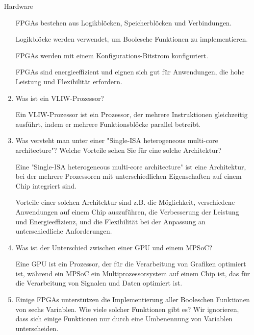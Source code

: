 \documentclass{article}
\begin{document}
\begin{exercise}{Hardware}
\begin{enumerate}
          \begin{solution}
            FPGAs bestehen aus Logikblöcken, Speicherblöcken und Verbindungen.

            Logikblöcke werden verwendet, um Boolesche Funktionen zu implementieren.

            FPGAs werden mit einem Konfigurations-Bitstrom konfiguriert.

            FPGAs sind energieeffizient und eignen sich gut für Anwendungen, die hohe Leistung und Flexibilität erfordern.
          \end{solution}

    \item Was ist ein VLIW-Prozessor?

          \begin{solution}
            Ein VLIW-Prozessor ist ein Prozessor, der mehrere Instruktionen gleichzeitig ausführt, indem er mehrere Funktionsblöcke parallel betreibt.
          \end{solution}

    \item Was versteht man unter einer "Single-ISA heterogeneous multi-core architecture"? Welche Vorteile sehen Sie für eine solche Architektur?

          \begin{solution}
            Eine "Single-ISA heterogeneous multi-core architecture" ist eine Architektur, bei der mehrere Prozessoren mit unterschiedlichen Eigenschaften auf einem Chip integriert sind.

            Vorteile einer solchen Architektur sind z.B. die Möglichkeit, verschiedene Anwendungen auf einem Chip auszuführen, die Verbesserung der Leistung und Energieeffizienz, und die Flexibilität bei der Anpassung an unterschiedliche Anforderungen.
          \end{solution}

    \item Was ist der Unterschied zwischen einer GPU und einem MPSoC?

          \begin{solution}
            Eine GPU ist ein Prozessor, der für die Verarbeitung von Grafiken optimiert ist, während ein MPSoC ein Multiprozessorsystem auf einem Chip ist, das für die Verarbeitung von Signalen und Daten optimiert ist.
          \end{solution}

    \item Einige FPGAs unterstützen die Implementierung aller Booleschen Funktionen von sechs Variablen. Wie viele solcher Funktionen gibt es? Wir ignorieren, dass sich einige Funktionen nur durch eine Umbenennung von Variablen unterscheiden.


\end{enumerate}
\end{exercise}
\end{document}
